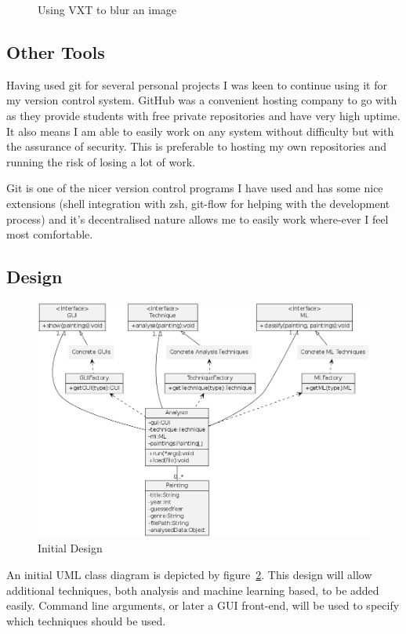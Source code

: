 \documentclass[11pt,fleqn,twoside]{article}
\begin{document}
\begin{figure}[p]
\caption{Using VXT to blur an image}
\label{fig:vxt}
\end{figure}

\subsection{Other Tools}
Having used git for several personal projects I was keen to continue using it for my version 
control system. GitHub was a convenient hosting company to go with as they provide students with 
free private repositories and have very high uptime. It also means I am able to easily work on any 
system without difficulty but with the assurance of security. This is preferable to hosting my own
repositories and running the risk of losing a lot of work.

Git is one of the nicer version control programs I have used and has some nice extensions (shell
integration with zsh, git-flow for helping with the development process) and it's decentralised 
nature allows me to easily work where-ever I feel most comfortable.

\subsection{Design}
\begin{figure}[H]
\includegraphics[scale=0.5]{img/design.png}
\caption{Initial Design}
\label{fig:init-class}
\end{figure}

An initial UML class diagram is depicted by figure~\ref{fig:init-class}. This design will allow 
additional techniques, both analysis and machine learning based, to be added easily. Command line
arguments, or later a GUI front-end, will be used to specify which techniques should be used.
\end{document}
